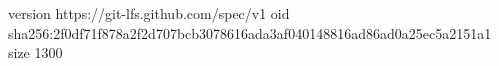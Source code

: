 version https://git-lfs.github.com/spec/v1
oid sha256:2f0df71f878a2f2d707bcb3078616ada3af040148816ad86ad0a25ec5a2151a1
size 1300
